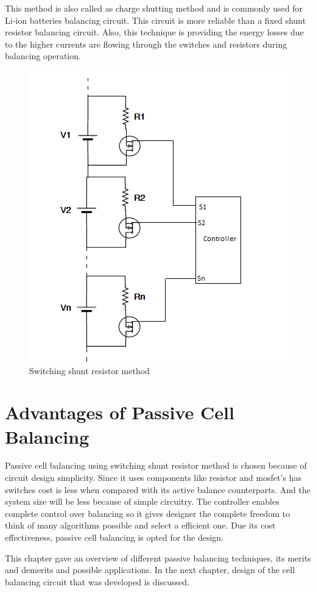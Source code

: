 This method is also called as charge shutting method and is commonly used for Li‐ion batteries balancing circuit. This circuit is more reliable than a fixed shunt resistor balancing circuit. Also, this technique is providing the energy losses due to the higher currents are flowing through the switches and resistors during balancing operation\cite{hemavathi}.

\begin{figure}[h!]
    \centering
    \includegraphics[]{Chapter2/Figures/switchedR.PNG}
    \caption{Switching  shunt resistor method}
\end{figure}
\section{Advantages of Passive Cell Balancing}

Passive cell balancing using switching shunt resistor method is chosen because of circuit design simplicity. Since it uses components like resistor and \acrshort{mosfet}'s has switches cost is less when compared with its active balance counterparts. And the system size will be less because of simple circuitry. The controller enables complete control over balancing so it gives designer the complete freedom to think of many algorithms possible and select a efficient one. Due its cost effectiveness, passive cell balancing is opted for the design.

\vspace{1cm}

This chapter gave an overview of different passive balancing techniques, its merits and demerits and possible applications. In the next chapter, design of the cell balancing circuit that was developed is discussed.  